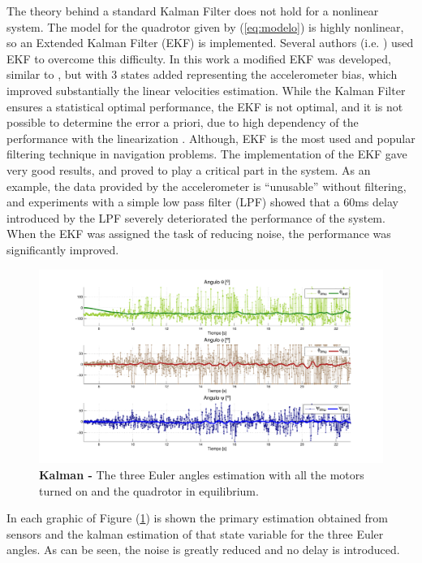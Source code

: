 \documentclass[conference]{IEEEtran}
\newcommand{\refp}[1]{(\ref{#1})}
\begin{document}
The theory behind a standard Kalman Filter does not hold for a nonlinear system. The model for the quadrotor given by \refp{eq:modelo} is highly nonlinear, so an Extended Kalman Filter (EKF) is implemented. Several authors (i.e. \cite{bib:kalman,bib:kalman2}) used EKF to overcome this difficulty. In this work a modified EKF was developed, similar to \cite{bib:kalman,bib:kalman2}, but with 3 states added representing the accelerometer bias, which improved substantially the linear velocities estimation. While the Kalman Filter ensures a statistical optimal performance, the EKF is not optimal, and it is not possible to determine the error a priori, due to high dependency of the performance with the linearization \cite{bib:kay}. Although, EKF is the most used and popular filtering technique in navigation problems. The implementation of the EKF gave very good results, and proved to play a critical part in the system. As an example, the data provided by the accelerometer is ``unusable'' without filtering, and experiments with a simple low pass filter (LPF) showed that a 60ms delay introduced by the LPF severely deteriorated the performance of the system. When the EKF was assigned the task of reducing noise, the performance was significantly improved.

 \begin{figure}
	\hspace{-.8cm}
	\includegraphics[width=1.12\columnwidth]{./pics_paper/kalman.pdf}
	\caption{\textbf{Kalman -} The three Euler angles estimation with all the motors turned on and the quadrotor in equilibrium.}
	\label{fig:kalman}
\end{figure}

In each graphic of Figure \refp{fig:kalman} is shown the primary estimation obtained from sensors and the kalman estimation of that state variable for the three Euler angles. As can be seen, the noise is greatly reduced and no delay is introduced.\\
\end{document}
